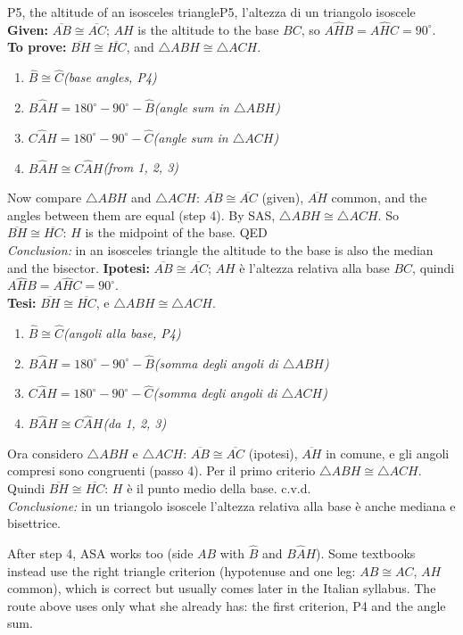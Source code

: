 \documentclass[10pt,a4paper,oneside]{book}
\newcommand{\ang}[3]{#1\widehat{#2}#3}      %
\newcommand{\av}[1]{\widehat{#1}}           %
\newcommand{\seg}[1]{\overline{#1}}         %
\newcommand{\tri}[1]{\triangle #1}          %
\newcommand{\step}[2]{\item #1\hfill{\small\color{slate}\itshape(#2)}}
\newenvironment{steps}{\begin{enumerate}[label=\arabic*., leftmargin=1.5em, itemsep=1pt]}{\end{enumerate}}
\begin{document}
\begin{proofbox}{P5, the altitude of an isosceles triangle}{P5, l'altezza di un triangolo isoscele}
\textbf{Given:} $\seg{AB} \cong \seg{AC}$; $AH$ is the altitude to the base $BC$, so $\ang{A}{H}{B} = \ang{A}{H}{C} = 90^\circ$.\\
\textbf{To prove:} $\seg{BH} \cong \seg{HC}$, and $\tri{ABH} \cong \tri{ACH}$.
\begin{steps}
\step{$\av{B} \cong \av{C}$}{base angles, P4}
\step{$\ang{B}{A}{H} = 180^\circ - 90^\circ - \av{B}$}{angle sum in $\tri{ABH}$}
\step{$\ang{C}{A}{H} = 180^\circ - 90^\circ - \av{C}$}{angle sum in $\tri{ACH}$}
\step{$\ang{B}{A}{H} \cong \ang{C}{A}{H}$}{from 1, 2, 3}
\end{steps}
Now compare $\tri{ABH}$ and $\tri{ACH}$: $\seg{AB} \cong \seg{AC}$ (given), $\seg{AH}$ common, and the angles between them are equal (step 4). By SAS, $\tri{ABH} \cong \tri{ACH}$. So $\seg{BH} \cong \seg{HC}$: $H$ is the midpoint of the base. \hfill QED\\
\emph{Conclusion:} in an isosceles triangle the altitude to the base is also the median and the bisector.
\tcblower
\textbf{Ipotesi:} $\seg{AB} \cong \seg{AC}$; $AH$ è l'altezza relativa alla base $BC$, quindi $\ang{A}{H}{B} = \ang{A}{H}{C} = 90^\circ$.\\
\textbf{Tesi:} $\seg{BH} \cong \seg{HC}$, e $\tri{ABH} \cong \tri{ACH}$.
\begin{steps}
\step{$\av{B} \cong \av{C}$}{angoli alla base, P4}
\step{$\ang{B}{A}{H} = 180^\circ - 90^\circ - \av{B}$}{somma degli angoli di $\tri{ABH}$}
\step{$\ang{C}{A}{H} = 180^\circ - 90^\circ - \av{C}$}{somma degli angoli di $\tri{ACH}$}
\step{$\ang{B}{A}{H} \cong \ang{C}{A}{H}$}{da 1, 2, 3}
\end{steps}
Ora considero $\tri{ABH}$ e $\tri{ACH}$: $\seg{AB} \cong \seg{AC}$ (ipotesi), $\seg{AH}$ in comune, e gli angoli compresi sono congruenti (passo 4). Per il primo criterio $\tri{ABH} \cong \tri{ACH}$. Quindi $\seg{BH} \cong \seg{HC}$: $H$ è il punto medio della base. \hfill c.v.d.\\
\emph{Conclusione:} in un triangolo isoscele l'altezza relativa alla base è anche mediana e bisettrice.
\end{proofbox}

\begin{tutor}
After step 4, ASA works too (side $AB$ with $\av{B}$ and $\ang{B}{A}{H}$). Some textbooks instead use the right triangle criterion (hypotenuse and one leg: $AB \cong AC$, $AH$ common), which is correct but usually comes later in the Italian syllabus. The route above uses only what she already has: the first criterion, P4 and the angle sum.
\end{tutor}
\end{document}
